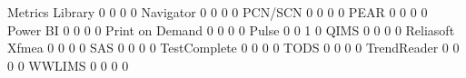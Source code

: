 \documentclass{article}
\begin{document}
\begin{Schunk}
\begin{Soutput}
  Metrics Library                0            0   0                      0
  Navigator                      0            0   0                      0
  PCN/SCN                        0            0   0                      0
  PEAR                           0            0   0                      0
  Power BI                       0            0   0                      0
  Print on Demand                0            0   0                      0
  Pulse                          0            0   1                      0
  QIMS                           0            0   0                      0
  Reliasoft Xfmea                0            0   0                      0
  SAS                            0            0   0                      0
  TestComplete                   0            0   0                      0
  TODS                           0            0   0                      0
  TrendReader                    0            0   0                      0
  WWLIMS                         0            0   0                      0
                               

\end{Soutput}
\end{Schunk}
\end{document}
